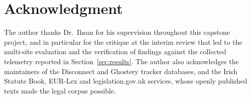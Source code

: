\documentclass[conference]{IEEEtran}
\begin{document}
\section*{Acknowledgment}
The author thanks Dr.\ Ihsan for his supervision throughout this capstone project, and in particular for the critique at the interim review that led to the multi-site evaluation and the verification of findings against the collected telemetry reported in Section~\ref{sec:results}. The author also acknowledges the maintainers of the Disconnect and Ghostery tracker databases, and the Irish Statute Book, EUR-Lex and legislation.gov.uk services, whose openly published texts made the legal corpus possible.



\end{document}
